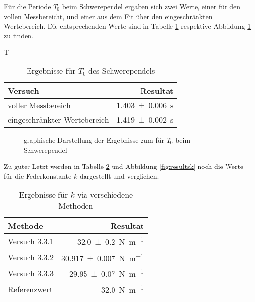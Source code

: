 F\"ur  die  Periode   $T_0$  beim  Schwerependel  ergaben   sich  zwei  Werte,
einer  f\"ur  den vollen  Messbereicht,  und  einer  aus  dem Fit  \"uber  den
eingeschr\"ankten  Wertebereich. Die  entsprechenden  Werte  sind  in  Tabelle
\ref{tab:resultsT0} respektive Abbildung \ref{fig:resultsT0} zu finden.

T\begin{table}[h!]
    \centering
    \caption{Ergebnisse f\"ur $T_0$ des Schwerependels}
    \label{tab:resultsT0}
    \begin{tabular}{p{70mm}r}
        \toprule
        Versuch                         & Resultat \\
        \midrule
        voller Messbereich              & \SI{1.403 \pm 0.006}{\second} \\
        eingeschr\"ankter Wertebereich  & \SI{1.419 \pm 0.002}{\second} \\
        \bottomrule
    \end{tabular}
\end{table}

\pgfplotsset{try min ticks=2}
\begin{figure}[ht!]
\centering
{}
\caption{graphische Darstellung der Ergebnisse zum f\"ur $T_0$ beim Schwerependel}
\label{fig:resultsT0}
\end{figure}

Zu   guter  Letzt   werden   in  Tabelle   \ref{tab:resultsk}  und   Abbildung
\ref{fig:resultsk} noch die Werte f\"ur die Federkonstante $k$ dargestellt und
verglichen.

\begin{table}[h!]
    \centering
    \caption{Ergebnisse f\"ur $k$ via verschiedene Methoden}
    \label{tab:resultsk}
    \begin{tabular}{p{70mm}r}
        \toprule
        Methode       & Resultat \\
        \midrule
        Versuch 3.3.1 & \SI{32.0   \pm  0.2}{\newton\per\meter} \\
        Versuch 3.3.2 & \SI{30.917 \pm  0.007}{\newton\per\meter} \\
        Versuch 3.3.3 & \SI{29.95 \pm  0.07}{\newton\per\meter} \\
        Referenzwert  & \SI{32.0}{\newton\per\meter} \\
        \bottomrule
    \end{tabular}
\end{table}

